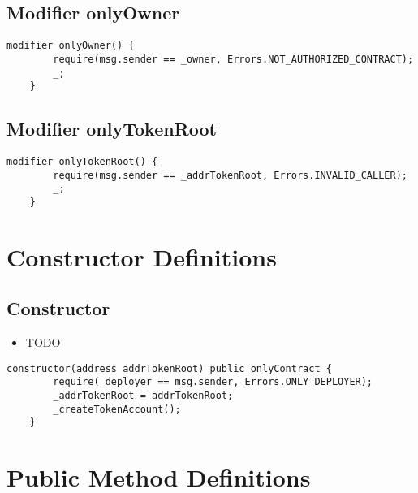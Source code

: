 \subsection{Modifier onlyOwner}


\begin{lstlisting}[firstnumber=34]
    modifier onlyOwner() {
        require(msg.sender == _owner, Errors.NOT_AUTHORIZED_CONTRACT);
        _;
    }
\end{lstlisting}

\subsection{Modifier onlyTokenRoot}


\begin{lstlisting}[firstnumber=39]
    modifier onlyTokenRoot() {
        require(msg.sender == _addrTokenRoot, Errors.INVALID_CALLER);
        _;
    }
\end{lstlisting}

\section{Constructor Definitions}


\subsection{Constructor}

\begin{itemize}
\item TODO
\end{itemize}

\begin{lstlisting}[firstnumber=46]
    constructor(address addrTokenRoot) public onlyContract {
        require(_deployer == msg.sender, Errors.ONLY_DEPLOYER);
        _addrTokenRoot = addrTokenRoot;
        _createTokenAccount();
    }
\end{lstlisting}

\section{Public Method Definitions}


